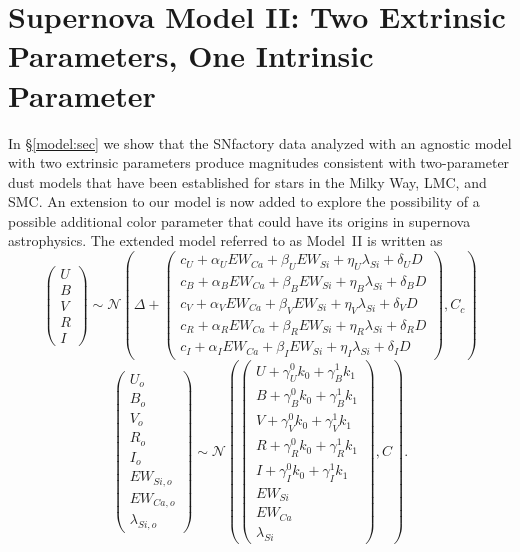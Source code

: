 \documentclass{aastex61}   	%
\begin{document}
\color{black}


\section{Supernova Model II: Two Extrinsic Parameters, One Intrinsic Parameter}
\label{model2:sec}
In \S\ref{model:sec} we show that the SNfactory data analyzed with an agnostic model with
two extrinsic parameters produce
magnitudes consistent
with two-parameter dust models that have been established for stars in the Milky Way, LMC, and SMC.
An extension to our model is now added to explore the possibility of
a possible additional
color parameter that could have its origins in supernova astrophysics.
The extended model referred to as Model~II is written as
\begin{equation}
\begin{pmatrix}
U\\B\\V\\R\\I
\end{pmatrix}
\sim \mathcal{N}
\left(
\Delta +
\begin{pmatrix}
c_U+\alpha_U EW_{Ca} + \beta_U EW_{Si} + \eta_U \lambda_{Si} + \delta_U D\\
c_B+\alpha_B EW_{Ca} + \beta_B EW_{Si} + \eta_B \lambda_{Si} + \delta_B D \\
c_V+\alpha_V EW_{Ca} + \beta_V EW_{Si} + \eta_V \lambda_{Si} + \delta_V D\\
c_R+\alpha_R EW_{Ca} + \beta_R EW_{Si} + \eta_R \lambda_{Si} + \delta_R D\\
c_I+\alpha_I EW_{Ca} + \beta_I EW_{Si}+ \eta_I \lambda_{Si} + \delta_I D
\end{pmatrix}
,C_{c}
\right)
\label{ewsiv2:eqn}
\end{equation}
\begin{equation}
\begin{pmatrix}
U_o\\B_o\\ V_o\\R_o\\I_o\\EW_{Si, o}\\ EW_{Ca, o} \\ \lambda_{Si, o}
\end{pmatrix}
\sim \mathcal{N}
\left(
\begin{pmatrix}
U +\gamma^0_{U} k_0 +\gamma^1_{B} k_1 \\B +\gamma^0_{B} k_0 +\gamma^1_{B} k_1 \\
V+\gamma^0_{V} k_0+\gamma^1_{V} k_1\\R+\gamma^0_{R} k_0 + \gamma^1_{R} k_1\\I+\gamma^0_{I} k_0+\gamma^1_{I} k_1\\
EW_{Si}\\ EW_{Ca} \\ \lambda_{Si}
\end{pmatrix}
,C
\right).
\label{dust2:eqn}
\end{equation}
\end{document}
